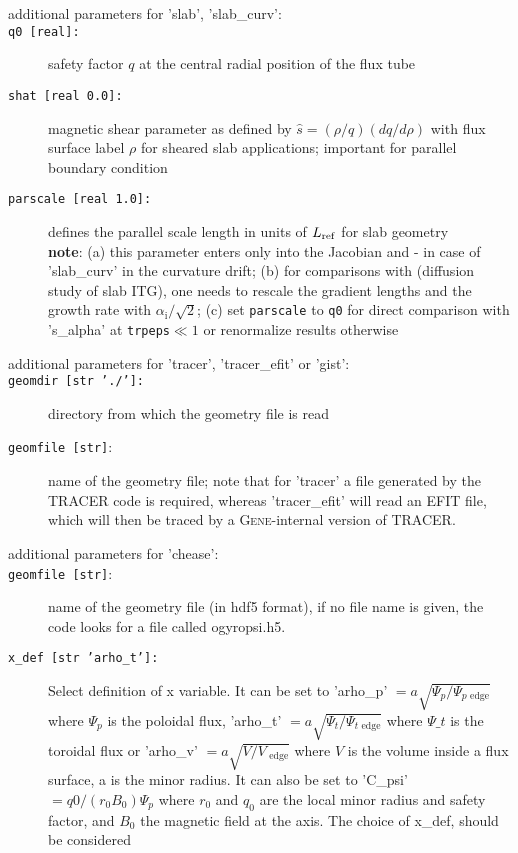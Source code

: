 \documentclass[12pt]{article}
\begin{document}
\begin{description}
\item[additional parameters for 'slab', 'slab\_curv':]
\item[\hypertarget{q0}{\texttt{q0 [real]:}}] safety factor $q$ at the central radial position of the flux tube
\item[\texttt{shat [real 0.0]:}] magnetic shear parameter as defined by $\hat s=(\rho/q)(dq/d\rho)$ with flux surface label $\rho$
for sheared slab applications; important for parallel boundary condition
\item[\texttt{parscale [real 1.0]:}] defines the parallel scale length
in units of $L_{\rm ref}$ for slab geometry\\
\textbf{note}: (a) this parameter enters only into the Jacobian and - in case of 'slab\_curv' in the curvature drift; (b) for
comparisons with \cite{diffusion} (diffusion study of slab ITG), one needs to
rescale the gradient lengths and the growth rate with $\alpha_\mathrm{i} / \sqrt{2}$;
(c) set {\tt parscale} to {\tt q0} for direct comparison with 's\_alpha' at {\tt trpeps}$\ll 1$ or renormalize results otherwise
%
\item[additional parameters for 'tracer', 'tracer\_efit' or 'gist':]
\item[\texttt{geomdir [str './']:}] directory from which the geometry file is read
\item[\texttt{geomfile [str]}:] name of the geometry file; note that for 'tracer' a file generated by
the TRACER code is required, whereas 'tracer\_efit' will read an EFIT file, which will then be traced
by a \textsc{Gene}-internal version of TRACER.
\item[additional parameters for 'chease':]
\item[\texttt{geomfile [str]}:] name of the geometry file (in hdf5 format), if
  no file name is given, the code looks for a file called ogyropsi.h5.
\item[\texttt{x\_def [str 'arho\_t']:}] Select definition of x variable.  It can be
  set to 'arho\_p' $=a \sqrt{\Psi_p / \Psi_{p\mbox{ edge}}}$ where $\Psi_p$ is the
  poloidal flux, 'arho\_t' $=a \sqrt{\Psi_t / \Psi_{t\mbox{ edge}}}$ where $\Psi\_t$ is the
  toroidal flux or 'arho\_v' $=a \sqrt{V / V_{\mbox{ edge}}}$ where $V$ is the
  volume inside a flux surface, a is the minor radius. It can also be set to 'C\_psi'
  $=q0/(r_0 B_0) \Psi_p$ where $r_0$ and $q_0$ are the local minor radius and
  safety factor, and $B_0$ the magnetic field at the axis. The choice of x\_def, should be considered

\end{description}
\end{document}

